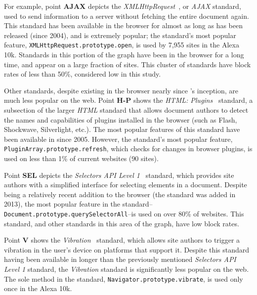 For example, point \textbf{AJAX} depicts the \emph{XMLHttpRequest}~\cite{ajaxwhatwg},
or \emph{AJAX} standard, used to send information to a server
without fetching the entire document again.  This standard has been available in
the browser for almost as long as \FF has been released (since 2004), and is
extremely popular; the standard's most popular feature, \texttt{XMLHttpRequest.prototype.open},
is used by 7,955 sites in the Alexa 10k.  Standards in this portion of the graph have been in the browser
for a long time, and appear on a large fraction of sites.  This cluster of
standards have block rates of less than 50\%, considered low in this study.

Other standards, despite existing in the browser nearly since \FF's inception,
are much less popular on the web.  Point \textbf{H-P} shows the
\emph{HTML: Plugins}~\cite{htmlpluginsw3c} standard, a subsection of the
larger \emph{HTML} standard that allows document authors to detect the
names and capabilities of plugins installed in the browser (such as
Flash, Shockwave, Silverlight, etc.).  The most popular features of this standard
have been available in \FF since 2005.  However, the standard's most popular feature, \texttt{PluginArray.prototype.refresh}, which checks for
changes in browser plugins, is used on less than 1\% of current websites (90 sites).

Point \textbf{SEL} depicts the \emph{Selectors API Level 1}~\cite{selectors1w3c}
standard, which provides site authors with a simplified interface for selecting
elements in a document.  Despite being a relatively recent addition to the
browser (the standard was added in 2013), the most popular feature in the
standard--\texttt{Document.prototype.querySelectorAll}--is used on
over 80\% of websites.  This standard, and other standards in this area of the
graph, have low block rates.

Point \textbf{V} shows the \emph{Vibration}~\cite{vibrationapi}
standard, which allows site authors to trigger a vibration in the user's device
on platforms that support it.  Despite this standard having been available in \FF
longer than the previously mentioned \emph{Selectors API Level 1} standard,
the \emph{Vibration} standard is significantly less popular on the web.  The
sole method in the standard, \texttt{Navigator.prototype.vibrate}, is used only
once in the Alexa 10k.


